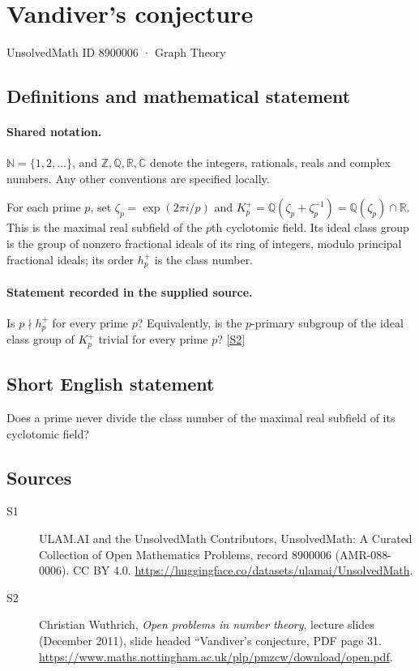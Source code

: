 \documentclass[11pt]{article}
\newcommand{\sref}[2]{\hyperlink{source:#1:#2}{[S#2]}}
\begin{document}
\setcounter{section}{8900005}
\section{Vandiver's conjecture}\label{8900006}
{\small\sffamily UnsolvedMath ID 8900006 · Graph Theory}
\subsection{Definitions and mathematical statement}

\paragraph{Shared notation.}$\mathbb N=\{1,2,\ldots\}$, and $\mathbb Z,\mathbb Q,\mathbb R,\mathbb C$ denote the integers, rationals, reals and complex numbers. Any other conventions are specified locally.


For each prime $p$, set $\zeta_p=\exp(2\pi i/p)$ and $K_p^+=\mathbb Q(\zeta_p+\zeta_p^{-1})=\mathbb Q(\zeta_p)\cap\mathbb R$. This is the maximal real subfield of the $p$th cyclotomic field. Its ideal class group is the group of nonzero fractional ideals of its ring of integers, modulo principal fractional ideals; its order $h_p^+$ is the class number.
\paragraph{Statement recorded in the supplied source.}
Is $p\nmid h_p^+$ for every prime $p$? Equivalently, is the $p$-primary subgroup of the ideal class group of $K_p^+$ trivial for every prime $p$? \sref{8900006}{2}

\subsection{Short English statement}
Does a prime never divide the class number of the maximal real subfield of its cyclotomic field?
\subsection{Sources}
\begin{description}
\item[\hypertarget{source:8900006:1}{S1}] ULAM.AI and the UnsolvedMath Contributors, UnsolvedMath: A Curated Collection of Open Mathematics Problems, record 8900006 (AMR-088-0006). CC BY 4.0. \url{https://huggingface.co/datasets/ulamai/UnsolvedMath}.
\item[\hypertarget{source:8900006:2}{S2}] Christian Wuthrich, \emph{Open problems in number theory}, lecture slides (December 2011), slide headed ``Vandiver's conjecture, PDF page 31. \url{https://www.maths.nottingham.ac.uk/plp/pmzcw/download/open.pdf}.
\end{description}
\label{end:8900006}
\end{document}
